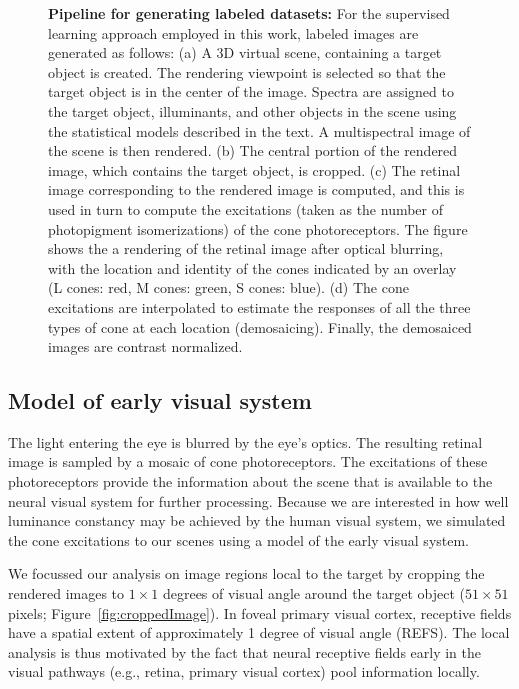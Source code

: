 \documentclass{jov}
\begin{document}
\begin{figure}
\begin{subfigure}[b]{0.2 \textwidth}
        \label{fig:coneContrast}
    \end{subfigure}
    \label{fig:sceneWithCroppedImage}
    \caption{{\bf Pipeline for generating labeled datasets:}  For the supervised learning approach employed in this work, labeled images are generated as follows: (a) A 3D virtual scene, containing a target object is created. The rendering viewpoint is selected so that the target object is in the center of the image. Spectra are assigned to the target object, illuminants, and other objects in the scene using the statistical models described in the text. A multispectral image of the scene is then rendered. (b) The central portion of the rendered image, which contains the target object, is cropped. (c) The retinal image corresponding to the rendered image is computed, and this is used in turn to compute the excitations (taken as the number of photopigment isomerizations) of the cone photoreceptors. The figure shows the a rendering of the retinal image after optical blurring, with the location and identity of the cones indicated by an overlay (L cones: red, M cones: green, S cones: blue).  (d) The cone excitations are interpolated to estimate the responses of all the three types of cone at each location (demosaicing). Finally, the demosaiced images are contrast normalized.}
\end{figure}

\subsection{Model of early visual system} \label{method:Isetbio}
The light entering the eye is blurred by the eye's optics.
The resulting retinal image is sampled by a mosaic of cone photoreceptors.
The excitations of these photoreceptors provide the information about the scene that is available to the neural visual system for further processing.
Because we are interested in how well luminance constancy may be achieved by the human visual system, we simulated the cone excitations
to our scenes using a model of the early visual system.

We focussed our analysis on image regions local to the target by cropping the rendered images to $1 \times 1$ degrees of visual angle around the target object ($51 \times 51$ pixels; Figure~\ref{fig:croppedImage}). In foveal primary visual cortex, receptive fields have a spatial extent of approximately 1 degree of visual angle (REFS). 
The local analysis is thus motivated by the fact that neural receptive fields early in the visual pathways (e.g., retina, primary visual cortex) pool information locally.
\end{document}
